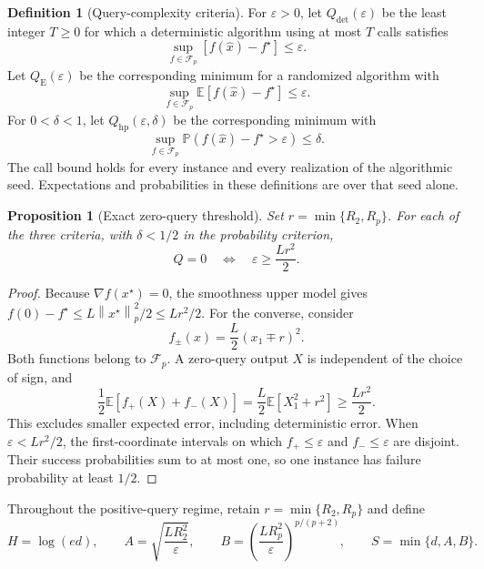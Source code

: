 \documentclass[11pt]{article}
\newcommand{\E}{\mathbb{E}}
\newcommand{\Prob}{\mathbb{P}}
\newcommand{\cF}{\mathcal{F}}
\newcommand{\norm}[2]{\left\lVert #1\right\rVert_{#2}}
\newcommand{\Qdet}{Q_{\mathrm{det}}}
\newcommand{\Qexp}{Q_{\mathrm{E}}}
\newcommand{\Qhp}{Q_{\mathrm{hp}}}
\newcommand{\eps}{\varepsilon}
\newtheorem{proposition}[proposition]{Proposition}
\theoremstyle{definition}
\newtheorem{definition}[definition]{Definition}
\theoremstyle{remark}
\begin{document}
\begin{definition}[Query-complexity criteria]
\label{def:criteria}
For $\eps>0$, let $\Qdet(\eps)$ be the least integer $T\ge0$ for which a
deterministic algorithm using at most $T$ calls satisfies
\[
 \sup_{f\in\cF_p}[f(\widehat x)-f^\star]\le\eps.
\]
Let $\Qexp(\eps)$ be the corresponding minimum for a randomized algorithm
with
\[
 \sup_{f\in\cF_p}\E[f(\widehat x)-f^\star]\le\eps.
\]
For $0<\delta<1$, let $\Qhp(\eps,\delta)$ be the corresponding minimum
with
\[
 \sup_{f\in\cF_p}\Prob(f(\widehat x)-f^\star>\eps)\le\delta.
\]
The call bound holds for every instance and every realization of the
algorithmic seed. Expectations and probabilities in these definitions
are over that seed alone.
\end{definition}

\begin{proposition}[Exact zero-query threshold]
\label{prop:zero-query}
Set $r=\min\{R_2,R_p\}$. For each of the three criteria, with
$\delta<1/2$ in the probability criterion,
\begin{equation}
\label{eq:zero-query}
 Q=0\quad\Longleftrightarrow\quad\eps\ge\frac{Lr^2}{2}.
\end{equation}
\end{proposition}

\begin{proof}
Because $\nabla f(x^\star)=0$, the smoothness upper model gives
$f(0)-f^\star\le L\norm{x^\star}{p}^2/2\le Lr^2/2$.
For the converse, consider
\begin{equation}
\label{eq:two-quadratics}
 f_\pm(x)=\frac L2(x_1\mp r)^2.
\end{equation}
Both functions belong to $\cF_p$. A zero-query output $X$ is independent
of the choice of sign, and
\[
 \frac12\E[f_+(X)+f_-(X)]
 =\frac L2\E[X_1^2+r^2]\ge\frac{Lr^2}{2}.
\]
This excludes smaller expected error, including deterministic error.
When $\eps<Lr^2/2$, the first-coordinate intervals on which
$f_+\le\eps$ and $f_-\le\eps$ are disjoint. Their success probabilities
sum to at most one, so one instance has failure probability at least
$1/2$.
\end{proof}

Throughout the positive-query regime, retain $r=\min\{R_2,R_p\}$ and define
\begin{equation}
\label{eq:scales}
 H=\log(ed),\qquad
 A=\sqrt{\frac{LR_2^2}{\eps}},\qquad
 B=\left(\frac{LR_p^2}{\eps}\right)^{p/(p+2)},\qquad
 S=\min\{d,A,B\}.
\end{equation}
\end{document}
